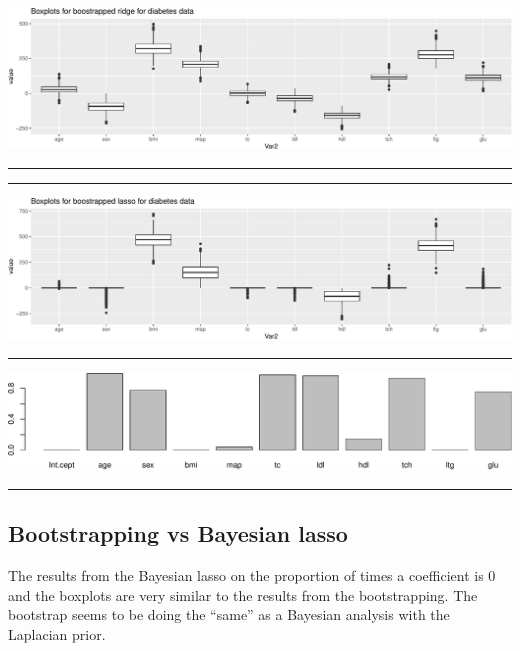 \documentclass[
  letterpaper,
  DIV=11,
  numbers=noendperiod]{scrartcl}
\begin{document}
\includegraphics{W6_files/figure-pdf/unnamed-chunk-23-1.pdf}

\begin{center}\rule{0.5\linewidth}{0.5pt}\end{center}

\begin{center}\rule{0.5\linewidth}{0.5pt}\end{center}

\includegraphics{W6_files/figure-pdf/unnamed-chunk-25-1.pdf}

\begin{center}\rule{0.5\linewidth}{0.5pt}\end{center}

\includegraphics{W6_files/figure-pdf/unnamed-chunk-26-1.pdf}

\begin{center}\rule{0.5\linewidth}{0.5pt}\end{center}

\hypertarget{bootstrapping-vs-bayesian-lasso}{%
\subsection{Bootstrapping vs Bayesian
lasso}\label{bootstrapping-vs-bayesian-lasso}}

The results from the Bayesian lasso on the proportion of times a
coefficient is 0 and the boxplots are very similar to the results from
the bootstrapping. The bootstrap seems to be doing the ``same'' as a
Bayesian analysis with the Laplacian prior.
\end{document}
